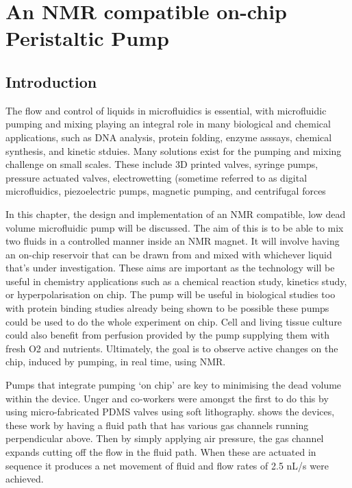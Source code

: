 
\chapter{An NMR compatible on-chip Peristaltic Pump}

\section{Introduction}

The flow and control of liquids in microfluidics is essential, with microfluidic pumping
and mixing playing an integral role in many biological and chemical applications, such as
DNA analysis\citep{RN74, RN75}, protein folding\citep{RN76}, enzyme asssays\citep{RN77, RN78}, chemical synthesis\citep{RN79,RN80}, and kinetic stduies\citep{RN81, RN82}. Many solutions exist for the pumping and mixing challenge on small scales.
These include 3D printed valves\citep{RN83, RN84}, syringe pumps\citep{RN85,RN86,RN87}, pressure actuated valves\citep{RN88, RN89, RN90},
electrowetting (sometime referred to as digital microfluidics\citep{RN91, RN92}, piezoelectric pumps\citep{RN93, RN94}, magnetic pumping\citep{RN95,RN96}, and centrifugal forces\citep{RN97, RN98, RN99}

In this chapter, the design and implementation of an NMR compatible, low dead volume
microfluidic pump will be discussed. The aim of this is to be able to mix two fluids in a
controlled manner inside an NMR magnet. It will involve having an on-chip reservoir that
can be drawn from and mixed with whichever liquid that’s under investigation. These aims
are important as the technology will be useful in chemistry applications such as a chemical
reaction study, kinetics study, or hyperpolarisation on chip. The pump will be useful in
biological studies too with protein binding studies already being shown to be possible\citep{RN26}
these pumps could be used to do the whole experiment on chip. Cell and living tissue
culture could also benefit from perfusion provided by the pump supplying them with fresh O2
and nutrients. Ultimately, the goal is to observe active changes on the chip, induced by
pumping, in real time, using NMR.

Pumps that integrate pumping ‘on chip’ are key to minimising the dead volume within the device.
Unger and co-workers\citep{RN59} were amongst the first to do this by using micro-fabricated PDMS valves
using soft lithography.  shows the devices, these work by having a fluid path that has various gas
channels running perpendicular above. Then by simply applying air pressure, the gas channel expands cutting off
the flow in the fluid path. When these are actuated in sequence it produces a net movement
of fluid and flow rates of 2.5 nL/s were achieved.

